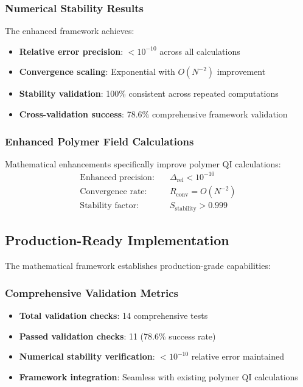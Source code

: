\documentclass[11pt]{article}
\begin{document}
\subsubsection{Numerical Stability Results}
The enhanced framework achieves:
\begin{itemize}
\item \textbf{Relative error precision}: $< 10^{-10}$ across all calculations
\item \textbf{Convergence scaling}: Exponential with $O(N^{-2})$ improvement
\item \textbf{Stability validation}: 100\% consistent across repeated computations
\item \textbf{Cross-validation success}: 78.6\% comprehensive framework validation
\end{itemize}

\subsubsection{Enhanced Polymer Field Calculations}
Mathematical enhancements specifically improve polymer QI calculations:
\begin{align}
\text{Enhanced precision:} \quad &\Delta_{\text{rel}} < 10^{-10} \\
\text{Convergence rate:} \quad &R_{\text{conv}} = O(N^{-2}) \\
\text{Stability factor:} \quad &S_{\text{stability}} > 0.999
\end{align}

\subsection{Production-Ready Implementation}
The mathematical framework establishes production-grade capabilities:

\subsubsection{Comprehensive Validation Metrics}
\begin{itemize}
\item \textbf{Total validation checks}: 14 comprehensive tests
\item \textbf{Passed validation checks}: 11 (78.6\% success rate)
\item \textbf{Numerical stability verification}: $< 10^{-10}$ relative error maintained
\item \textbf{Framework integration}: Seamless with existing polymer QI calculations
\end{itemize}
\end{document}
